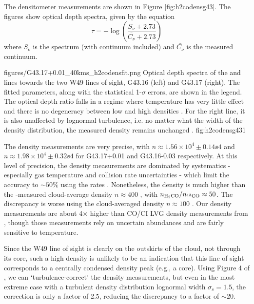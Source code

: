 The \formaldehyde densitometer measurements are shown in Figure \ref{fig:h2codensg43}.
The figures show optical depth spectra, given by the equation
$$\tau = -\log\left(\frac{S_\nu + 2.73}{\bar{C_\nu} + 2.73}\right)$$
where $S_\nu$ is the spectrum (with continuum included) and $\bar{C_\nu}$ is
the measured continuum.

{figures/G43.17+0.01_40kms_h2codensfit.png}
{Optical depth spectra of the \oneone and \twotwo lines towards the two W49
lines of sight, G43.16 (left) and G43.17 (right).  The fitted parameters, along with the statistical 1-$\sigma$
errors, are shown in the legend.  The optical depth ratio falls in a regime
where temperature has very little effect and there is no degeneracy between low
and high densities \citep[see Figure 2 of][]{Ginsburg2011a}.  For the right line,
it is also unaffected by lognormal turbulence, i.e. no matter what the width of
the density distribution, the measured density remains unchanged \citep[see
Figure 3 of][]{Ginsburg2011a}.}
{fig:h2codensg43}{1}

The density measurements are very precise, with $n\approx1.56\times10^4 \pm
0.14\ee{4}$ \percc and $n\approx 1.98\times10^4 \pm 0.32\ee{4}$ \percc for
G43.17+0.01 and G43.16-0.03 respectively.  At this level of precision, the 
density measurements are dominated by systematics - especially gas temperature
and collision rate uncertainties - which limit the accuracy to $\sim50\%$ using
the \citet{Green1991} rates
\citep{Zeiger2010}.  Nonetheless, the density is much higher than the
\thirteenco-measured cloud-average density $n\approx 400$ \percc
\citep[for cloud GRSMC\_G043.04-00.11;][]{Roman-Duval2010a}, with
$n_{\textrm{H}_2\textrm{CO}}/n_{^{13}\textrm{CO}} \approx 50$.  The discrepancy is worse using
the \citet{Simon2001a} cloud-averaged density $n\approx 100$ \percc.
Our density measurements are about 4$\times$ higher than CO/CI LVG density
measurements from \citet{Plume2004a}, though those measurements rely on
uncertain abundances and are fairly sensitive to temperature.

Since the W49 line of sight is clearly on the outskirts of the cloud, not
through its core, such a high density is unlikely to be an indication that
this line of sight corresponds to a centrally condensed density peak (e.g., a core).  Using
Figure 4 of \citet{Ginsburg2011a}, we can `turbulence-correct' the density
measurements, but even in the most extreme case with a turbulent density
distribution lognormal width $\sigma_s = 1.5$, the correction is only a factor
of 2.5, reducing the discrepancy to a factor of $\sim20$.

